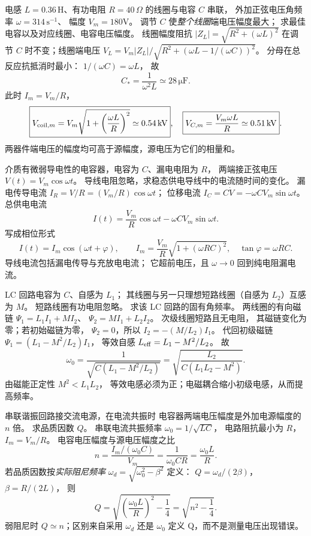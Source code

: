 电感 $L=0.36\,\mathrm H$、有功电阻
$R=40\,\Omega$ 的线圈与电容 $C$ 串联，
外加正弦电压角频率 $\omega=314\,\mathrm{s^{-1}}$、
幅度 $V_m=180$V。
调节 $C$ 使\emph{整个线圈}端电压幅度最大；
求最佳电容以及对应线圈、电容电压幅度。
\exsolution
线圈幅度阻抗
$|Z_L|=\sqrt{R^2+(\omega L)^2}$
在调节 $C$ 时不变；线圈端电压
$V_L=V_m|Z_L|/
\sqrt{R^2+(\omega L-1/(\omega C))^2}$。
分母在总反应抗抵消时最小：
$1/(\omega C)=\omega L$，
故
\[
\boxed{C_*=\frac1{\omega^2L}
\simeq28\,\mathrm{\mu F}}.
\]
此时 $I_m=V_m/R$，
\[
\boxed{V_{{\rm coil},m}=
V_m\sqrt{1+\left(\frac{\omega L}{R}\right)^2}
\simeq0.54\,\mathrm{kV}},
\quad
\boxed{V_{C,m}=\frac{V_m\omega L}{R}
\simeq0.51\,\mathrm{kV}}.
\]
\excheck 两器件端电压的幅度均可高于源幅度，源电压为它们的相量和。

介质有微弱导电性的电容器，电容为 $C$、漏电电阻为 $R$，
两端接正弦电压
$V(t)=V_m\cos\omega t$。
导线电阻忽略，求稳态供电导线中的电流随时间的变化。
\exsolution
漏电传导电流
$I_R=V/R=(V_m/R)\cos\omega t$；
位移电流
$I_C=C\dot V=-\omega CV_m\sin\omega t$。
总供电电流
\[
I(t)=\frac{V_m}{R}\cos\omega t-\omega CV_m\sin\omega t.
\]
写成相位形式
\[
\boxed{I(t)=I_m\cos(\omega t+\varphi)},\qquad
\boxed{I_m=\frac{V_m}{R}\sqrt{1+(\omega RC)^2}},
\quad
\boxed{\tan\varphi=\omega RC}.
\]
\excheck 导线电流包括漏电传导与充放电电流；
它超前电压，且 $\omega\to0$ 回到纯电阻漏电流。

LC 回路电容为 $C$、自感为 $L_1$；
其线圈与另一只理想短路线圈（自感为 $L_2$）互感为 $M$。
短路线圈有功电阻忽略。
求该 LC 回路的固有角频率。
\exsolution
两线圈的有向磁链
$\Psi_1=L_1I_1+MI_2$、
$\Psi_2=MI_1+L_2I_2$。
次级线圈短路且无电阻，
其磁链变化为零；若初始磁链为零，
$\Psi_2=0$，所以
$I_2=-(M/L_2)I_1$。
代回初级磁链
$\Psi_1=(L_1-M^2/L_2)I_1$，
等效自感
$L_{\rm eff}=L_1-M^2/L_2$。
故
\[
\boxed{\omega_0=
\frac1{\sqrt{C(L_1-M^2/L_2)}}
=\sqrt{\frac{L_2}{C(L_1L_2-M^2)}}}.
\]
\excheck 由磁能正定性 $M^2<L_1L_2$，
等效电感必须为正；电磁耦合缩小初级电感，从而提高频率。

串联谐振回路接交流电源，在电流共振时
电容器两端电压幅度是外加电源幅度的 $n$ 倍。
求品质因数 $Q$。
\exsolution
串联电流共振频率
$\omega_0=1/\sqrt{LC}$，
电路阻抗最小为 $R$，
$I_m=V_m/R$。
电容电压幅度与源电压幅度之比
\[
n=\frac{I_m/(\omega_0 C)}{V_m}
=\frac1{\omega_0CR}
=\frac{\omega_0L}{R}.
\]
若品质因数按\emph{实际阻尼频率}
$\omega_d=\sqrt{\omega_0^2-\beta^2}$ 定义：
$Q=\omega_d/(2\beta)$，
$\beta=R/(2L)$，
则
\[
\boxed{Q=\sqrt{\left(\frac{\omega_0L}{R}\right)^2
-\frac14}
=\sqrt{n^2-\frac14}}.
\]
\excheck 弱阻尼时 $Q\simeq n$；区别来自采用 $\omega_d$ 还是 $\omega_0$ 定义 Q，而不是测量电压出现错误。

